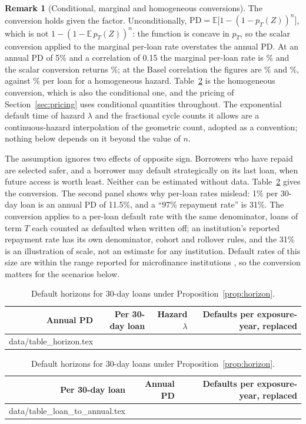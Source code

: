 \documentclass[11pt]{article}
\makeatletter
\theoremstyle{plain}
\theoremstyle{definition}
\newtheorem{remark}{Remark}
\newcommand{\inputrows}[1]{\@@input #1 }
\newcommand{\E}{\mathbb{E}}
\makeatother
\begin{document}
\begin{remark}[Conditional, marginal and homogeneous conversions]\label{rem:marginal}
The conversion holds given the factor. Unconditionally, $\mathrm{PD}=\E\bigl[1-(1-p_T(Z))^n\bigr]$,
which is not $1-(1-\E\,p_T(Z))^n$: the function is concave in $p_T$, so the scalar conversion applied to
the marginal per-loan rate overstates the annual PD. At an annual PD of 5\% and a correlation of 0.15 the
marginal per-loan rate is \MarginalLoanPDHigh\% and the scalar conversion returns \ScalarReconversionHigh\%;
at the Basel correlation the figures are \MarginalLoanPDBasel\% and \ScalarReconversionBasel\%, against
\HomogeneousLoanPD\% per loan for a homogeneous hazard. Table~\ref{tab:horizon} is the homogeneous
conversion, which is also the conditional one, and the pricing of Section~\ref{sec:pricing} uses
conditional quantities throughout. The exponential default time of hazard $\lambda$ and the fractional
cycle counts it allows are a continuous-hazard interpolation of the geometric count, adopted as a
convention; nothing below depends on it beyond the value of $n$.
\end{remark}

The assumption ignores two effects of opposite sign. Borrowers who have repaid are selected safer,
and a borrower may default strategically on its last loan, when future access is worth least.
Neither can be estimated without data. Table~\ref{tab:horizon} gives the conversion. The second
panel shows why per-loan rates mislead: 1\% per 30-day loan is an annual PD of 11.5\%, and a
``97\% repayment rate'' is 31\%. The conversion applies to a per-loan default rate with the same
denominator, loans of term $T$ each counted as defaulted when written off; an institution's reported
repayment rate has its own denominator, cohort and rollover rules, and the 31\% is an illustration of
scale, not an estimate for any institution. Default rates of this size are within the range reported
for microfinance institutions \citep{cull2009}, so the conversion matters for the scenarios below.

\begin{table}[ht]
  \centering\small
  \caption{Default horizons for 30-day loans under Proposition~\ref{prop:horizon}.}
  \label{tab:horizon}
  \begin{tabular}{rrrr}
    \toprule
    Annual PD & Per 30-day loan & Hazard $\lambda$ & Defaults per exposure-year, replaced \\
    \midrule
    \inputrows{data/table_horizon.tex}
    \bottomrule
  \end{tabular}
  \par\medskip
  \begin{tabular}{rrr}
    \toprule
    Per 30-day loan & Annual PD & Defaults per exposure-year, replaced \\
    \midrule
    \inputrows{data/table_loan_to_annual.tex}
    \bottomrule
  \end{tabular}
\end{table}
\end{document}
